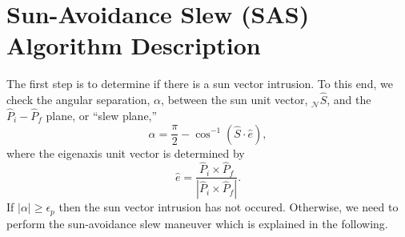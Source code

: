 \documentclass[journal ]{new-aiaa}
\begin{document}
\section{Sun-Avoidance Slew (SAS) Algorithm Description} 
	The first step is to determine if there is a sun vector intrusion. To this end, we check the angular separation, $\alpha$, between the sun unit vector, $_\mathcal{N}\hat{S}$, and the $\hat{P}_i-\hat{P}_f$ plane, or ``slew plane,''
		\begin{equation}
		\alpha=\frac{\pi}{2}-\cos^{-1}(\hat{S}\cdot\hat{e}),
		\end{equation}
		where the eigenaxis unit vector is determined by
		\begin{equation}\label{eaxis}
		\hat{e}=\frac{\hat{P}_i\times\hat{P}_f}{|\hat{P}_i\times \hat{P}_f|}.
		\end{equation} 
If $|\alpha|\geq\epsilon_p$ then the sun vector intrusion has not occured. Otherwise, we need to perform the sun-avoidance slew maneuver which is explained in the following.
\end{document}
